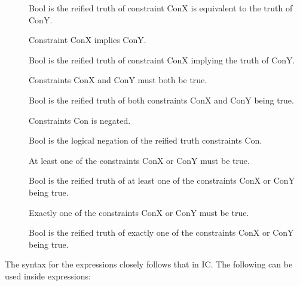 \begin{description}
\item[]
Bool is the reified truth of constraint ConX is equivalent to the truth of ConY.

\item[]
Constraint ConX  implies ConY.

\item[]
Bool is the reified truth of constraint ConX implying the truth of ConY.

\item[]
Constraints ConX and ConY must both be true.

\item[]
Bool is the reified truth of both constraints ConX and ConY being true.

\item[]
Constraints Con is negated.

\item[]
Bool is the logical negation of the reified truth constraints Con.

\item[]
At least one of the constraints ConX or ConY must be true.

\item[]
Bool is the reified truth of at least one of the constraints ConX or ConY being true.

\item[]
Exactly one of the constraints ConX or ConY must be true.

\item[]
Bool is the reified truth of exactly one of the constraints ConX or ConY being
 true.

\end{description}

The syntax for the expressions closely follows that in IC. The 
following can be used inside expressions:

